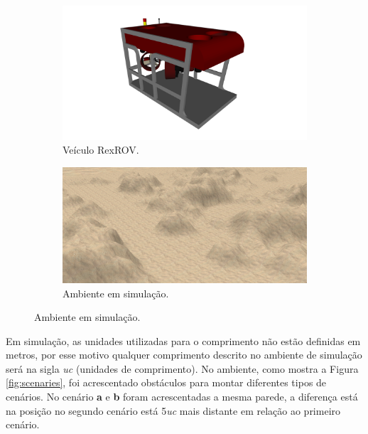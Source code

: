 \begin{figure}[H]
    \centering
    \caption{Veículo e ambiente utilizado na simulação virtual.}
    \label{fig:simulation}
    \begin{subfigure}[t]{0.4\textwidth}
        \includegraphics[width=\textwidth]{dados/figuras/rexrov.png}
        \caption{Veículo RexROV.}
        \label{fig:rexrov}
    \end{subfigure}
    \hspace{1em}
    \begin{subfigure}[t]{0.55\textwidth}
        \includegraphics[width=\textwidth]{dados/figuras/environment.png}
        \caption{Ambiente em simulação.}
        \label{fig:environment}
    \end{subfigure}
\end{figure}

Em simulação, as unidades utilizadas para o comprimento não estão definidas em metros, por esse motivo qualquer comprimento descrito no ambiente de simulação será na sigla \textit{uc} (unidades de comprimento).
No ambiente, como mostra a Figura \ref{fig:scenaries}, foi acrescentado obstáculos para montar diferentes tipos de cenários.
No cenário \textbf{a} e \textbf{b} foram acrescentadas a mesma parede, a diferença está na posição no segundo cenário está 5\textit{uc} mais distante em relação ao primeiro cenário.

